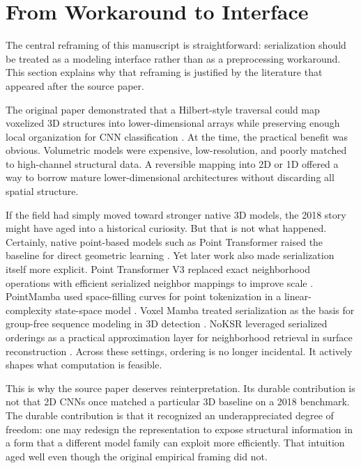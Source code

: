 \section{From Workaround to Interface}




The central reframing of this manuscript is straightforward: serialization should be treated as a modeling interface rather than as a preprocessing workaround. This section explains why that reframing is justified by the literature that appeared after the source paper.

The original paper demonstrated that a Hilbert-style traversal could map voxelized 3D structures into lower-dimensional arrays while preserving enough local organization for CNN classification \citep{corcoran2018spatial}. At the time, the practical benefit was obvious. Volumetric models were expensive, low-resolution, and poorly matched to high-channel structural data. A reversible mapping into 2D or 1D offered a way to borrow mature lower-dimensional architectures without discarding all spatial structure.

If the field had simply moved toward stronger native 3D models, the 2018 story might have aged into a historical curiosity. But that is not what happened. Certainly, native point-based models such as Point Transformer raised the baseline for direct geometric learning \citep{zhao2021pointtransformer}. Yet later work also made serialization itself more explicit. Point Transformer V3 replaced exact neighborhood operations with efficient serialized neighbor mappings to improve scale \citep{wu2024ptv3}. PointMamba used space-filling curves for point tokenization in a linear-complexity state-space model \citep{liang2024pointmamba}. Voxel Mamba treated serialization as the basis for group-free sequence modeling in 3D detection \citep{zhang2024voxelmamba}. NoKSR leveraged serialized orderings as a practical approximation layer for neighborhood retrieval in surface reconstruction \citep{li2025noksr}. Across these settings, ordering is no longer incidental. It actively shapes what computation is feasible.

This is why the source paper deserves reinterpretation. Its durable contribution is not that 2D CNNs once matched a particular 3D baseline on a 2018 benchmark. The durable contribution is that it recognized an underappreciated degree of freedom: one may redesign the representation to expose structural information in a form that a different model family can exploit more efficiently. That intuition aged well even though the original empirical framing did not.

